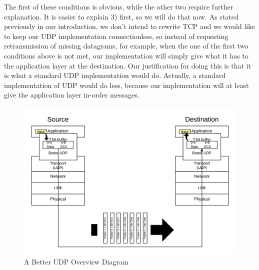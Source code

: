 \documentclass[conference]{IEEEtran}
\theoremstyle{definition}
\begin{document}
\noindent The first of these conditions is obvious, while
the other two require further explanation.  It is easier
to explain 3) first, so we will do that now.  As stated
previously in our introduction, we don't intend to rewrite
TCP and we would like to keep our UDP implementation
connectionless, so instead of requesting retransmission
of missing datagrams, for example, when the one of the first
two conditions above is not met, our implementation will
simply give what it has to the application layer at the
destination.  Our justification for doing this is that it
is what a standard UDP implementation would do.  Actually,
a standard implementation of UDP would do less, because our
implementation will at least give the application layer
in-order messages.


\begin{figure}[h!]                                                          %
\centering                                                                  %
  \includegraphics[scale=0.125]{PNGs/System_Schematic-Overview}             %
\caption{A Better UDP Overview Diagram}                                   %
\label{overview_schematic}                                                  %
\end{figure}                                                                %
\end{document}
